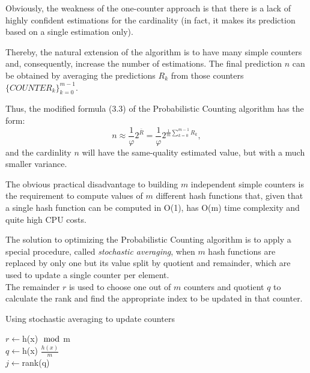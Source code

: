 \documentclass[a4paper,13pt]{article}
\theoremstyle{mytheor}
\begin{document}
Obviously, the weakness of the one-counter approach is that there is
a lack of highly confident estimations for the cardinality (in fact, it makes
its prediction based on a single estimation only).\

Thereby, the natural extension of the algorithm is to have many simple
counters and, consequently, increase the number of estimations. The final
prediction $n$ can be obtained by averaging the predictions $R_k$ from those
counters $\{COUNTER_k\}_{k=0}^{m-1}$.

Thus, the modified formula (3.3) of the Probabilistic Counting
algorithm has the form:
\[
    n \approx \frac{1}{\varphi}2^{\bar{R}} = \frac{1}{\varphi}2^{\frac{1}{m}{\sum\limits_{k=0}^{m-1}R_k}},
\]
and the cardinlity $n$ will have the same-quality estimated value, but
with a much smaller variance.

The obvious practical disadvantage to building $m$ independent simple
counters is the requirement to compute values of $m$ different hash
functions that, given that a single hash function can be computed in
O(1), has O(m) time complexity and quite high CPU costs.

The solution to optimizing the Probabilistic Counting algorithm is to
apply a special procedure, called \textit{stochastic averaging}, when $m$ hash
functions are replaced by only one but its value split by quotient and
remainder, which are used to update a single counter per element.\\
The remainder $r$ is used to choose one out of $m$ counters and quotient $q$
to calculate the rank and find the appropriate index to be updated in
that counter.\\
\begin{algorithm}[H]
    \DontPrintSemicolon
    \LinesNumberedHidden
    \caption[]{Using stochastic averaging to update counters}
    $r\gets$h(x)$\mod$m\\
    $q \gets $h(x)  $\frac{h(x)}{m}$\\ %
    $j \gets $rank(q)\\
\end{algorithm}
\end{document}
